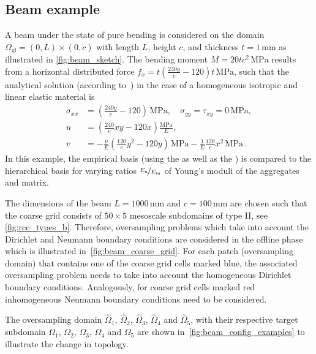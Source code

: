 \documentclass[AMA,STIX1COL,doublespace]{WileyNJD-v2}
\begin{document}
\subsection{Beam example}%
\label{sub:beam_example}
A beam under the state of pure bending is considered on the domain
$\varOmega_{\mathrm{gl}} = (0, L)\times(0, c)$ with length $L$, height $c$, and
thickness $t=1\,\mathrm{mm}$ as illustrated in \cref{fig:beam_sketch}.
The bending moment $M=20tc^2\,\mathrm{MPa}$ results from a horizontal
distributed force $f_x = t\left(\frac{240y}{c} - 120\right)t\,\mathrm{MPa}$, such that the analytical solution
(according to~\cite{LeeBathe1993}) in the case of a homogeneous
isotropic and linear elastic material is
\begin{align}
	\label{eq:beam_solution}
    \sigma_{xx} &= \left(\frac{240y}{c} - 120\right)\,\mathrm{MPa}, \quad \sigma_{yy} = \tau_{xy} = 0\,\mathrm{MPa},\\
    u &= \left(\frac{240}{c} xy - 120 x\right) \frac{\mathrm{MPa}}{E},\\
    v &= -\frac{\nu}{E} \left(\frac{120}{c}y^2 - 120y\right)\,\mathrm{MPa} - \frac{1}{E} \frac{120}{c}x^2\,\mathrm{MPa}\,.
\end{align}
In this example, the empirical basis (using the  as
well as the ) is compared to the hierarchical basis
for varying ratios $\nicefrac{E_{\mathrm{a}}}{E_{\mathrm{m}}}$ of Young's moduli
of the aggregates and matrix.

The dimensions of the beam $L=1000\,\mathrm{mm}$ and $c=100\,\mathrm{mm}$ are
chosen such that the
coarse grid consists of $50\times 5$ mesoscale subdomains of type II,
see \cref{fig:rce_types_b}.
Therefore, oversampling problems which take into account the Dirichlet
and Neumann boundary conditions are considered in the offline phase
which is illustrated in~\cref{fig:beam_coarse_grid}.
For each patch (oversampling domain) that contains one of the coarse grid
cells marked blue, the associated oversampling problem needs to take into
account the homogeneous Dirichlet boundary conditions.
Analogously, for coarse grid cells marked red inhomogeneous Neumann boundary
conditions need to be considered.

The oversampling domain $\hat\varOmega_1$, $\hat\varOmega_{2}$, $\hat\varOmega_{3}$, $\hat\varOmega_{4}$ and $\hat\varOmega_{5}$, with their respective target subdomain $\varOmega_1$, $\varOmega_{2}$, $\varOmega_{3}$, $\varOmega_{4}$ and $\varOmega_{5}$ are shown in~\cref{fig:beam_config_examples} to illustrate the change in topology.
\end{document}
